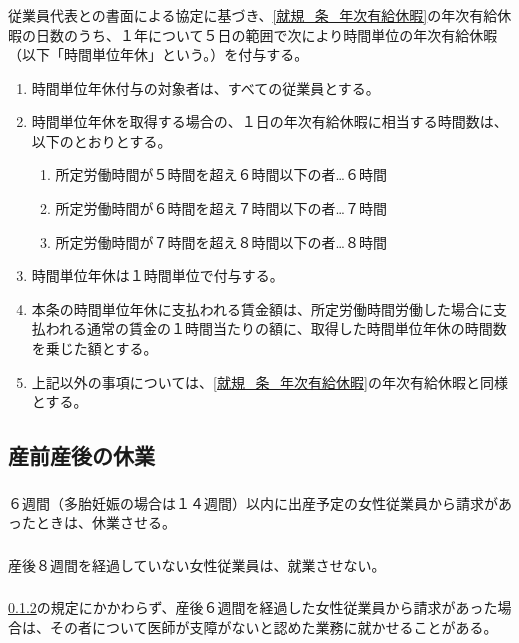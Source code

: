 \documentclass{jsarticle}
\begin{document}
\subsubsection{}
\label{就規_項_年次有給休暇の時間単位での付与}
従業員代表との書面による協定に基づき、\ref{就規_条_年次有給休暇}の年次有給休暇の日数のうち、１年について５日の範囲で次により時間単位の年次有給休暇（以下「時間単位年休」という。）を付与する。
  \begin{enumerate}
    \item 時間単位年休付与の対象者は、すべての従業員とする。
    \item 時間単位年休を取得する場合の、１日の年次有給休暇に相当する時間数は、以下のとおりとする。
    \begin{enumerate}
      \item 所定労働時間が５時間を超え６時間以下の者…６時間
      \item 所定労働時間が６時間を超え７時間以下の者…７時間
      \item 所定労働時間が７時間を超え８時間以下の者…８時間
    \end{enumerate}
    \item 時間単位年休は１時間単位で付与する。
    \item 本条の時間単位年休に支払われる賃金額は、所定労働時間労働した場合に支払われる通常の賃金の１時間当たりの額に、取得した時間単位年休の時間数を乗じた額とする。
    \item 上記以外の事項については、\ref{就規_条_年次有給休暇}の年次有給休暇と同様とする。
  \end{enumerate}

\subsection{産前産後の休業}
\label{就規_条_産前産後の休業}
\subsubsection{}
\label{就規_項_産前の休業}
６週間（多胎妊娠の場合は１４週間）以内に出産予定の女性従業員から請求があったときは、休業させる。
\subsubsection{}
\label{就規_項_産後の休業}
産後８週間を経過していない女性従業員は、就業させない。
\subsubsection{}
\label{就規_項_産後6週間経過後の復帰}
\ref{就規_項_産後の休業}の規定にかかわらず、産後６週間を経過した女性従業員から請求があった場合は、その者について医師が支障がないと認めた業務に就かせることがある。
\end{document}
